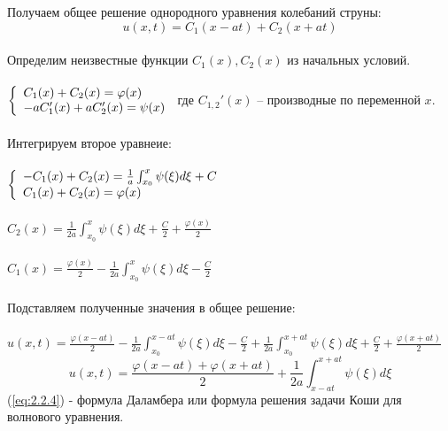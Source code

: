\documentclass[../main.tex]{subfiles}
\begin{document}
Получаем общее решение однородного уравнения колебаний струны:\\
\[u(x,t)=C_1(x-at)+C_2(x+at)\]\\
Определим неизвестные функции $C_1(x), C_2(x)$ из начальных условий.\\\\
$
	\begin{left}
		\{
		\begin{array}{lcl}
			C_{1}(x)+C_2(x)=\varphi(x) \\
			-aC_1'(x)+aC_2'(x)=\psi(x) \\
		\end{array}
		\right.
	\end{left}
$
где $C_{1,2}'(x)$ -- производные по переменной $x$.\\
\\Интегрируем второе уравнеие:\\\\
$
	\begin{left}
		\{
		\begin{array}{lcl}
			-C_1(x)+C_2(x)=\frac{1}{a}\int_{x_0}^x\psi(\xi)d\xi+C \\
			C_1(x)+C_2(x)=\varphi(x)                              \\
		\end{array}
		\right.
	\end{left}
$
\\\\
$C_2(x)=\frac{1}{2a}\int_{x_0}^x\psi(\xi)d\xi+\frac{C}{2}+\frac{\varphi(x)}{2}$\\\\
$C_1(x)=\frac{\varphi(x)}{2}-\frac{1}{2a}\int_{x_0}^x\psi(\xi)d\xi-\frac{C}{2}$\\\\
Подставляем полученные значения в общее решение:\\\\
$u(x,t)=\frac{\varphi(x-at)}{2}-\frac{1}{2a}\int_{x_0}^{x-at}\psi(\xi)d\xi-\frac{C}{2}+\frac{1}{2a}\int_{x_0}^{x+at}\psi(\xi)d\xi+\frac{C}{2}+\frac{\varphi(x+at)}{2}$
\begin{equation}\label{eq:2.2.4}
	u(x,t)=\frac{\varphi(x-at)+\varphi(x+at)}{2}+\frac{1}{2a}\int_{x-at}^{x+at}\psi(\xi)d\xi
\end{equation}
(\ref{eq:2.2.4}) - формула Даламбера или формула решения задачи Коши для волнового уравнения.
\end{document}

